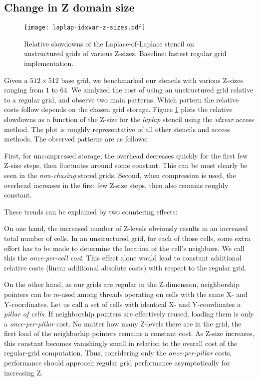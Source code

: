 \subsection{Change in Z domain size}

\begin{figure}
	\texttt{[image: laplap-idxvar-z-sizes.pdf]}
	\caption{\label{fig:laplap-z-sizes} Relative slowdowns of the Laplace-of-Laplace stencil on unstructured grids of various Z-sizes. Baseline: fastest regular grid implementation.}
\end{figure}

Given a $512\times 512$ base grid, we benchmarked our stencils with various Z-sizes ranging from $1$ to $64$. We analyzed the cost of using an unstructured grid relative to a regular grid, and observe two main patterns. Which pattern the relative costs follow depends on the chosen grid storage. Figure \ref{fig:laplap-z-sizes} plots the relative slowdowns as a function of the Z-size for the \emph{laplap} stencil using the \emph{idxvar} access method. The plot is roughly representative of all other stencils and access methods. The observed patterns are as follows:

First, for uncompressed storage, the overhead decreases quickly for the first few Z-size steps, then fluctuates around some constant. This can be most clearly be seen in the \emph{non-chasing} stored grids. Second, when compression is used, the overhead increases in the first few Z-size steps, then also remains roughly constant.

These trends can be explained by two countering effects:

On one hand, the increased number of Z-levels obviously results in an increased total number of cells. In an unstructured grid, for each of those cells, some extra effort has to be made to determine the location of the cell's neighbors. We call this the \emph{once-per-cell cost}. This effect alone would lead to constant additional relative costs (linear additional absolute costs) with respect to the regular grid.

On the other hand, as our grids are regular in the Z-dimension, neighborship pointers can be re-used among threads operating on cells with the same X- and Y-coordinates. Let us call a set of cells with identical X- and Y-coordinates a \emph{pillar of cells}. If neighborship pointers are effectively reused, loading them is only a \emph{once-per-pillar} cost. No matter how many Z-levels there are in the grid, the first load of the neighborhip pointers remains a constant cost. As Z-size increases, this constant becomes vanishingly small in relation to the overall cost of the regular-grid computation. Thus, considering only the \emph{once-per-pillar} costs, performance should approach regular grid performance asymptotically for increasing Z. 

